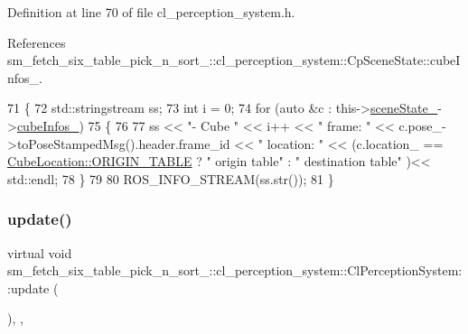 Definition at line 70 of file cl\+\_\+perception\+\_\+system.\+h.



References sm\+\_\+fetch\+\_\+six\+\_\+table\+\_\+pick\+\_\+n\+\_\+sort\+\_\+::cl\+\_\+perception\+\_\+system\+::\+Cp\+Scene\+State\+::cube\+Infos\+\_\+.


\begin{DoxyCode}
71             \{
72                 std::stringstream ss;
73                 \textcolor{keywordtype}{int} i = 0;
74                 \textcolor{keywordflow}{for} (\textcolor{keyword}{auto} &c : this->\hyperlink{classsm__fetch__six__table__pick__n__sort__1_1_1cl__perception__system_1_1ClPerceptionSystem_abf68c35d49ab0c766521e23f4e3b4d41}{sceneState\_}->\hyperlink{classsm__fetch__six__table__pick__n__sort__1_1_1cl__perception__system_1_1CpSceneState_a9e412e0e18779e1fe371b0160919bd9b}{cubeInfos\_})
75                 \{
76 
77                     ss << \textcolor{stringliteral}{"- Cube "} << i++ << \textcolor{stringliteral}{" frame: "} << c.pose\_->toPoseStampedMsg().header.frame\_id << \textcolor{stringliteral}{
      " location: "} << (c.location\_ == \hyperlink{namespacesm__fetch__six__table__pick__n__sort__1_1_1cl__perception__system_a371363065945abbb60dad8b56601afa0ae5ee34c3ef8ec4a46a00a218416c7b1d}{CubeLocation::ORIGIN\_TABLE} ? \textcolor{stringliteral}{" origin table"} : \textcolor{stringliteral}{"
       destination table"} )<< std::endl;
78                 \}
79 
80                 ROS\_INFO\_STREAM(ss.str());
81             \}
\end{DoxyCode}
\mbox{\label{classsm__fetch__six__table__pick__n__sort__1_1_1cl__perception__system_1_1ClPerceptionSystem_a87292907b7b771d19d91c6de47ea8d1d}} 
\subsubsection{\texorpdfstring{update()}{update()}}
{\footnotesize\ttfamily virtual void sm\+\_\+fetch\+\_\+six\+\_\+table\+\_\+pick\+\_\+n\+\_\+sort\+\_\+::cl\+\_\+perception\+\_\+system\+::\+Cl\+Perception\+System\+::update (\begin{DoxyParamCaption}{ }\end{DoxyParamCaption})\hspace{0.3cm}{\ttfamily [inline]}, {\ttfamily [override]}, {\ttfamily [virtual]}}



